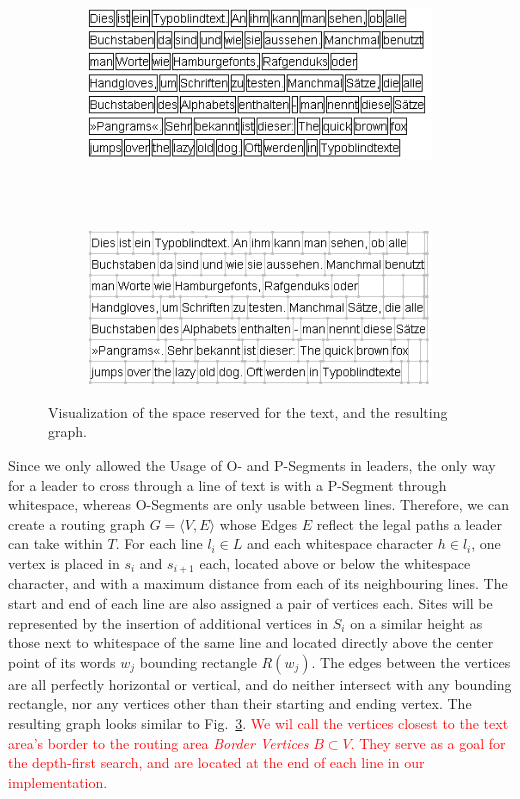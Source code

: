 \documentclass[11pt,a4paper]{vutinfth}
\newcommand{\change}[1]{\textcolor{red}{#1}}
\begin{document}
\begin{figure}
 \centering
 \begin{subfigure}[b]{\textwidth}
 \centering
  \includegraphics[]{WordBoundaries.png}
  \caption{\label{fig:wbound}}
 \end{subfigure}
 \\
 ~\\%
 \begin{subfigure}[b]{\textwidth}
 \centering
  \includegraphics[]{RoutingGraph_edited.png}
  \caption{\label{fig:rgraph}}
 \end{subfigure}
 \caption{Visualization of the space reserved for the text, and the resulting graph.}
\end{figure}

Since we only allowed the Usage of O- and P-Segments in leaders, the only way for a leader to cross through a line of text is with a P-Segment through whitespace, whereas O-Segments are only usable between lines. Therefore, we can create a routing graph $G=\langle V,E\rangle$ whose Edges $E$ reflect the legal paths a leader can take within $T$.
For each line $l_i \in L$ and each whitespace character $h \in l_i$, one vertex is placed in $s_i$ and $s_{i+1}$ each, located above or below the whitespace character, and with a maximum distance from each of its neighbouring lines. The start and end of each line are also assigned a pair of vertices each. Sites will be represented by the insertion of additional vertices in $S_i$ on a similar height as those next to whitespace of the same line and located directly above the center point of its words $w_j$ bounding rectangle $R(w_j)$. The edges between the vertices are all perfectly horizontal or vertical, and do neither intersect with any bounding rectangle, nor any vertices other than their starting and ending vertex. The resulting graph looks similar to Fig.~\ref{fig:rgraph}.
\change{We wil call the vertices closest to the text area's border to the routing area \emph{Border Vertices} $B \subset V$. They serve as a goal for the depth-first search, and are located at the end of each line in our implementation.}
\end{document}
